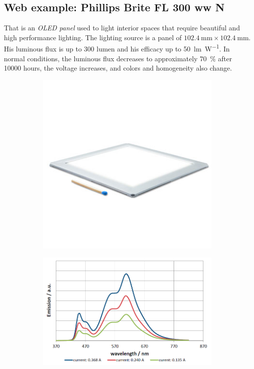 \documentclass[a4paper, 12pt]{paper}
\begin{document}
\subsection{Web example: Phillips Brite FL 300 ww N}

That is an \emph{OLED panel} used to light interior spaces that require beautiful and high performance lighting.
The lighting source is a panel of $\SI{102.4}{\milli\meter} \times \SI{102.4}{\milli\meter}$.
His luminous flux is up to 300 lumen and his efficacy up to \SI{50}{\lumen\per\watt}.
In normal conditions, the luminous flux decreases to approximately \SI{70}{\percent} after \SI{10000}{} hours, the voltage increases, and colors and homogeneity also change.

\begin{figure}[H]
    \centering
    \begin{subfigure}[p]{0.45\textwidth}
        \includegraphics[width=\textwidth]{img/oled}
    \end{subfigure}
    \begin{subfigure}[p]{0.45\textwidth}
        \includegraphics[width=\textwidth]{img/oled_emission}

\end{subfigure}
\end{figure}
\end{document}
